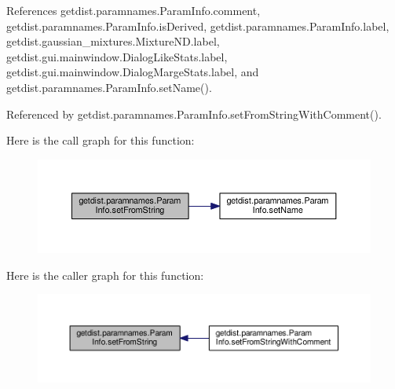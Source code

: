References getdist.\+paramnames.\+Param\+Info.\+comment, getdist.\+paramnames.\+Param\+Info.\+is\+Derived, getdist.\+paramnames.\+Param\+Info.\+label, getdist.\+gaussian\+\_\+mixtures.\+Mixture\+N\+D.\+label, getdist.\+gui.\+mainwindow.\+Dialog\+Like\+Stats.\+label, getdist.\+gui.\+mainwindow.\+Dialog\+Marge\+Stats.\+label, and getdist.\+paramnames.\+Param\+Info.\+set\+Name().



Referenced by getdist.\+paramnames.\+Param\+Info.\+set\+From\+String\+With\+Comment().

Here is the call graph for this function\+:
\nopagebreak
\begin{figure}[H]
\begin{center}
\leavevmode
\includegraphics[width=350pt]{classgetdist_1_1paramnames_1_1ParamInfo_a9959ca38efbef580c4322fe1003f49ae_cgraph}
\end{center}
\end{figure}
Here is the caller graph for this function\+:
\nopagebreak
\begin{figure}[H]
\begin{center}
\leavevmode
\includegraphics[width=350pt]{classgetdist_1_1paramnames_1_1ParamInfo_a9959ca38efbef580c4322fe1003f49ae_icgraph}
\end{center}
\end{figure}
\mbox{\label{classgetdist_1_1paramnames_1_1ParamInfo_aa0a42d010bdc8b85811ebdcaf7f3a299}} 
